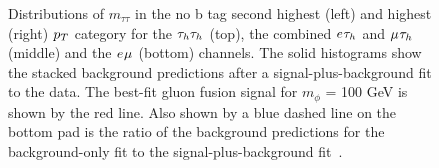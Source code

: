 \begin{figure}[!hbtp]
\caption[Plots of the $m_{\tau\tau}$ distributions in the low-mass optimisation categories.]{Distributions of $m_{\tau\tau}$ in the no b tag second highest (left) and highest (right) $p_{T}$ category for the $\tau_{h}\tau_{h}$ (top), the combined $e_{}\tau_{h}$ and $\mu_{}\tau_{h}$ (middle) and the $e_{}\mu_{}$ (bottom) channels. The solid histograms show the stacked background predictions after a signal-plus-background fit to the data. The best-fit gluon fusion signal for $m_{\phi}$ = 100 GeV is shown by the red line. Also shown by a blue dashed line on the bottom pad is the ratio of the background predictions for the background-only fit to the signal-plus-background fit~\cite{CMS:2022rbd}. }
\label{fig:low_mass_postfit}
\end{figure}

